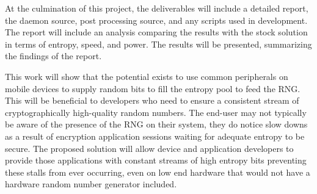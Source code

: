 
At the culmination of this project, the deliverables will include a detailed
report, the daemon source, post processing source, and any scripts used in
development. The report will include an analysis comparing the results with the
stock solution in terms of entropy, speed, and power. The results will be
presented, summarizing the findings of the report. 

This work will show that the potential exists to use common peripherals on
mobile devices to supply random bits to fill the entropy pool to feed the RNG.
This will be beneficial to developers who need to ensure a consistent stream of
cryptographically high-quality random numbers. The end-user may not typically be
aware of the presence of the RNG on their system, they do notice slow downs as a
result of encryption application sessions waiting for adequate entropy to be
secure. The proposed solution will allow device and application developers to
provide those applications with constant streams of high entropy bits preventing
these stalls from ever occurring, even on low end hardware that would not have a
hardware random number generator included.
